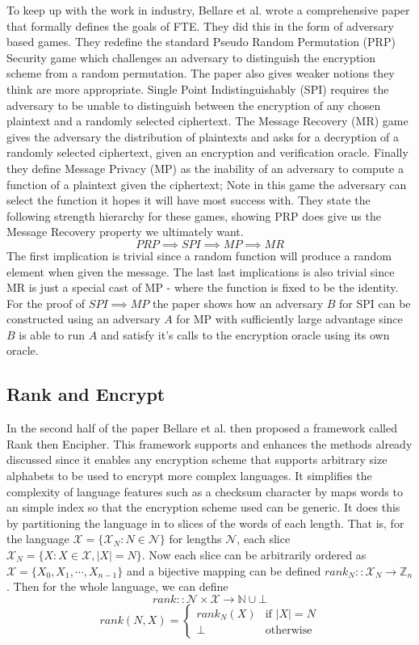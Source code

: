 \documentclass[10pt,a4paper]{article}
\begin{document}
To keep up with the work in industry, Bellare et al. wrote a comprehensive paper\cite{fpe} that formally defines the goals of FTE. They did this in the form of adversary based games. They redefine the standard Pseudo Random Permutation (PRP) Security game which challenges an adversary to distinguish the encryption scheme from a random permutation. The paper also gives weaker notions they think are more appropriate. Single Point Indistinguishably (SPI) requires the adversary to be unable to distinguish between the encryption of any chosen plaintext and a randomly selected ciphertext. The Message Recovery (MR) game gives the adversary the distribution of plaintexts and asks for a decryption of a randomly selected ciphertext, given an encryption and verification oracle. Finally they define Message Privacy (MP) as the inability of an adversary to compute a function of a plaintext given the ciphertext; Note in this game the adversary can select the function it hopes it will have most success with. They state the following strength hierarchy for these games, showing PRP does give us the Message Recovery property we ultimately want.
$$ PRP \implies SPI \implies MP \implies MR $$
The first implication is trivial since a random function will produce a random element when given the message. The last last implications is also trivial since MR is just a special cast of MP - where the function is fixed to be the identity. For the proof of $ SPI \implies MP $ the paper shows how an adversary $B$ for SPI can be  constructed using an adversary $A$ for MP with sufficiently large advantage since $B$ is able to run $A$ and satisfy it's calls to the encryption oracle using its own oracle.

\subsection{Rank and Encrypt}

In the second half of the paper\cite{fpe} Bellare et al. then proposed a framework called Rank then Encipher. This framework supports and enhances the methods already discussed since it enables any encryption scheme that supports arbitrary size alphabets to be used to encrypt more complex languages. It simplifies the complexity of language features such as a checksum character by maps words to an simple index so that the encryption scheme used can be generic. It does this by partitioning the language in to slices of the words of each length. That is, for the language $\mathcal{X} = \{\mathcal{X}_N : N \in \mathcal{N} \}$ for lengths $\mathcal{N}$, each slice $\mathcal{X}_N = \{ X : X \in \mathcal{X}, \vert X \vert = N  \}$. Now each slice can be arbitrarily ordered as $\mathcal{X} = \{ X_0, X_1, \cdots , X_{n-1} \} $ and a bijective mapping can be defined $rank_N :: \mathcal{X}_N \rightarrow \mathbb{Z}_n$.
Then for the whole language, we can define
$$ rank :: \mathcal{N} \times \mathcal{X} \rightarrow \mathbb{N} \cup \bot $$
$$ rank(N,X) =
\left\{
	\begin{array}{ll}
		rank_N(X)  & \mbox{if } \vert X \vert = N\\
		\bot & \mbox{otherwise} 
	\end{array}
\right.
$$
\end{document}

